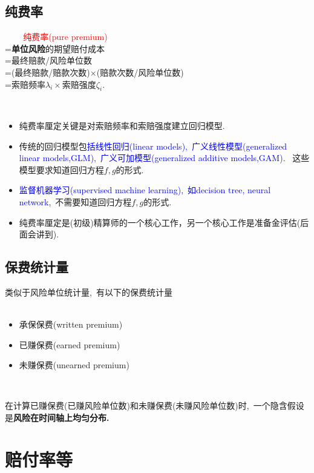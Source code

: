 \documentclass[professionalfont]{beamer}
\newcommand{\red}[1]{\textcolor{red}{#1}}
\newcommand{\green}[1]{\textbf{#1}}
\newcommand{\blue}[1]{\textcolor{blue}{#1}}
\begin{document}
\subsection{纯费率}
\begin{frame}
~ ~ ~\red{纯费率(pure premium)}\\=\green{单位风险}的期望赔付成本\\
=最终赔款/风险单位数\\=(最终赔款/赔款次数)$\times$(赔款次数/风险单位数)\\=索赔频率$\lambda_i\times$索赔强度$\zeta_i.$

~

\begin{itemize}
	\item 纯费率厘定关键是对索赔频率和索赔强度建立回归模型. 
	\item 传统的回归模型包\blue{括线性回归(linear models),~广义线性模型(generalized linear models,GLM),~广义可加模型(generalized additive models,GAM)}.~ 这些模型要求知道回归方程$f,g$的形式.
	\item \blue{监督机器学习(supervised machine learning),~如decision tree, neural network},~不需要知道回归方程$f,g$的形式.
	\item 纯费率厘定是(初级)精算师的一个核心工作，另一个核心工作是准备金评估(后面会讲到).
\end{itemize}


\end{frame}
\subsection{保费统计量}
\begin{frame}
类似于风险单位统计量,~有以下的保费统计量\\

~

\begin{itemize}
	\item 承保保费(written premium)
	\item 已赚保费(earned premium)
	\item 未赚保费(unearned premium)
\end{itemize}

~

在计算已赚保费(已赚风险单位数)和未赚保费(未赚风险单位数)时,~一个隐含假设是\green{风险在时间轴上均匀分布.}

\end{frame}

\section{赔付率等}
\end{document}
